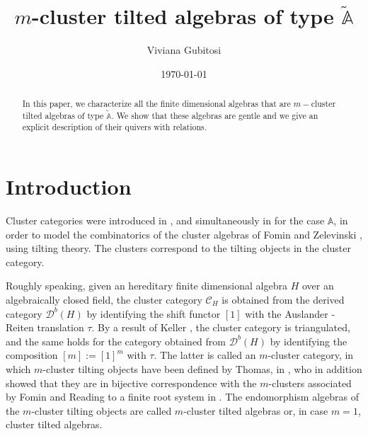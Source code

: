 \documentclass{amsart}
\date{\today}
\title[ $m$-cluster tilted algebras of type $\widetilde{\mathbb{A}}$]{ $m$-cluster tilted algebras of type $\widetilde{\mathbb{A}}$}
\author[V. Gubitosi]{Viviana Gubitosi}
\theoremstyle{plain}
\theoremstyle{definition}
\begin{document}
\maketitle

\begin{abstract}
 In this paper, we characterize all the finite dimensional algebras that are  $m-$cluster tilted algebras of type $\widetilde{\mathbb{A}}$. We show that these algebras are gentle and we give an explicit description of their quivers with relations.
\end{abstract}

\section*{Introduction} Cluster categories were introduced in \cite{Buan2006}, and simultaneously in \cite{CSS06} for the case $\mathbb{A}$,  in order to model the combinatorics of the cluster algebras of Fomin and Zelevinski \cite{FZ02}, using  tilting theory. The clusters correspond to the tilting objects in the cluster category.

Roughly speaking, given an hereditary finite dimensional algebra $H$ over an algebraically closed field, the cluster category $\mathcal{C}_H$ is obtained from the derived category $\mathcal{D}^b(H)$ by identifying the shift functor $[1]$ with the Auslander - Reiten translation $\tau$. By a result of Keller \cite{K05}, the cluster category is triangulated, and the same holds for  the category obtained from $\mathcal{D}^b(H)$ by identifying the composition $[m]:=[1]^m$ with $\tau$. The latter is called an $m$-cluster category, in which $m$-cluster tilting objects have been defined by Thomas, in \cite{Thomas2007}, who in addition showed that they are in bijective correspondence with the $m$-clusters associated by  Fomin and Reading to a finite root system in \cite{FR05}. The endomorphism algebras of the $m$-cluster tilting objects are called $m$-cluster tilted algebras or, in case $m=1$, cluster tilted algebras.
\end{document}
